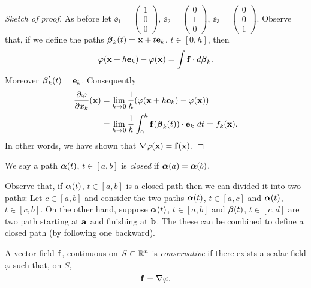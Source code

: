 \begin{proof}[Sketch of proof]

    As before let \(\ee_1 = \left(\begin{smallmatrix}
            1 \\ 0 \\ 0
        \end{smallmatrix}\right) \),
    \(\ee_2 = \left(\begin{smallmatrix}
            0 \\ 1 \\ 0
        \end{smallmatrix}\right) \),
    \(\ee_3 = \left(\begin{smallmatrix}
            0 \\ 0 \\ 1
        \end{smallmatrix}\right) \).
    Observe that, if we define the paths \(\bbeta_k(t) = \xx + t \ee_k\), \(t\in [0,h]\), then
    \[
        \varphi(\xx + h \ee_k) - \varphi(\xx) = \int \ff \cdot d\bbeta_k.
    \]
    Moreover \(\bbeta'_k(t) = \ee_k\).
    Consequently
    \[
        \begin{aligned}
            \frac{\partial \varphi}{\partial x_k}(\xx)
             & =  \displaystyle\lim_{h\to 0} \frac{1}{h}( \varphi(\xx + h \ee_k) - \varphi(\xx))                \\
             & = \displaystyle \lim_{h\to 0} \frac{1}{h} \int_0^h \ff(\bbeta_k(t)) \cdot \ee_k \ dt = f_k(\xx).
        \end{aligned}
    \]
    In other words, we have shown that \(\nabla \varphi (\xx) =  \ff(\xx)\).
\end{proof}

\begin{definition}
    We say a path \(\aalpha(t)\), \(t\in [a,b]\) is \emph{closed} if \(\aalpha(a) = \aalpha(b)\).
\end{definition}

Observe that, if \(\aalpha(t)\), \(t\in[a,b]\) is a closed path then we can divided it into two paths: Let \(c\in[a,b]\) and consider the two paths \(\aalpha(t)\), \(t\in[a,c]\) and  \(\aalpha(t)\), \(t\in[c,b]\).
On the other hand, suppose \(\aalpha(t)\), \(t\in [a,b]\) and  \(\bbeta(t)\), \(t\in [c,d]\) are two path starting at \(\aa\) and finishing at \(\bb\). The these can be combined to define a closed path (by following one backward).

\begin{definition}
    A vector field \(\ff\), continuous on \(S \subset \bR^n\) is \emph{conservative} if there exists a scalar field \(\varphi\) such that, on \(S\), \[\ff = \nabla \varphi.\]
\end{definition}

